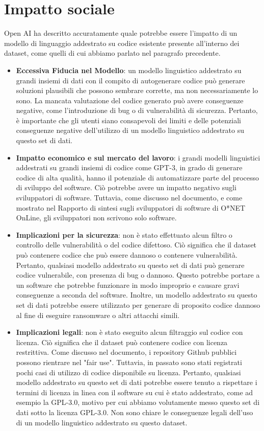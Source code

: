 \section{Impatto sociale}
Open AI ha descritto accuratamente quale potrebbe essere l'impatto di un modello di linguaggio addestrato su codice esistente presente all'interno dei dataset, come quelli di cui abbiamo parlato nel paragrafo precedente.
\begin{itemize}
    \item {\textbf{Eccessiva Fiducia nel Modello}}: un modello linguistico addestrato su grandi insiemi di dati  con il compito di autogenerare codice può generare soluzioni plausibili che possono sembrare corrette, ma non necessariamente lo sono. La mancata valutazione del codice generato può avere conseguenze negative, come l'introduzione di bug o di vulnerabilità di sicurezza. Pertanto, è importante che gli utenti siano consapevoli dei limiti e delle potenziali conseguenze negative dell'utilizzo di un modello linguistico addestrato su questo set di dati. \cite{https://doi.org/10.48550/arxiv.2107.03374}
    \item {\textbf{Impatto economico e sul mercato del lavoro}}: i grandi modelli linguistici addestrati su grandi insiemi di codice come GPT-3, in grado di generare codice di alta qualità, hanno il potenziale di automatizzare parte del processo di sviluppo del software. Ciò potrebbe avere un impatto negativo sugli sviluppatori di software. Tuttavia, come discusso nel documento, e come mostrato nel Rapporto di sintesi sugli sviluppatori di software di O*NET OnLine, gli sviluppatori non scrivono solo software.\cite{https://doi.org/10.48550/arxiv.2107.03374}
    \item {\textbf{Implicazioni per la sicurezza}}: non è stato effettuato alcun filtro o controllo delle vulnerabilità o del codice difettoso. Ciò significa che il dataset può contenere codice che può essere dannoso o contenere vulnerabilità. Pertanto, qualsiasi modello addestrato su questo set di dati può generare codice vulnerabile, con presenza di bug o dannoso. Questo potrebbe portare a un software che potrebbe funzionare in modo improprio e causare gravi conseguenze a seconda del software. Inoltre, un modello addestrato su questo set di dati potrebbe essere utilizzato per generare di proposito codice dannoso al fine di eseguire ransomware o altri attacchi simili.\cite{https://doi.org/10.48550/arxiv.2107.03374}
    \item{\textbf{Implicazioni legali}}: non è stato eseguito alcun filtraggio sul codice con licenza. Ciò significa che il dataset può contenere codice con licenza restrittiva. Come discusso nel documento, i repository Github pubblici possono rientrare nel "fair use". Tuttavia, in passato sono stati registrati pochi casi di utilizzo di codice disponibile su licenza. Pertanto, qualsiasi modello addestrato su questo set di dati potrebbe essere tenuto a rispettare i termini di licenza in linea con il software su cui è stato addestrato, come ad esempio la GPL-3.0, motivo per cui abbiamo volutamente messo questo set di dati sotto la licenza GPL-3.0. Non sono chiare le conseguenze legali dell'uso di un modello linguistico addestrato su questo dataset.\cite{https://doi.org/10.48550/arxiv.2107.03374}
\end{itemize}
